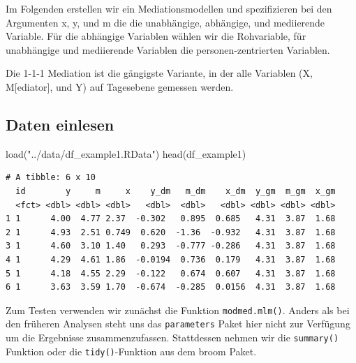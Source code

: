 \documentclass[
  letterpaper,
  DIV=11,
  numbers=noendperiod]{scrreprt}
\newenvironment{Shaded}{\begin{snugshade}}{\end{snugshade}}
\newcommand{\AttributeTok}[1]{\textcolor[rgb]{0.40,0.45,0.13}{#1}}
\newcommand{\CommentTok}[1]{\textcolor[rgb]{0.37,0.37,0.37}{#1}}
\newcommand{\ConstantTok}[1]{\textcolor[rgb]{0.56,0.35,0.01}{#1}}
\newcommand{\DecValTok}[1]{\textcolor[rgb]{0.68,0.00,0.00}{#1}}
\newcommand{\FunctionTok}[1]{\textcolor[rgb]{0.28,0.35,0.67}{#1}}
\newcommand{\NormalTok}[1]{\textcolor[rgb]{0.00,0.23,0.31}{#1}}
\newcommand{\OtherTok}[1]{\textcolor[rgb]{0.00,0.23,0.31}{#1}}
\newcommand{\SpecialCharTok}[1]{\textcolor[rgb]{0.37,0.37,0.37}{#1}}
\newcommand{\StringTok}[1]{\textcolor[rgb]{0.13,0.47,0.30}{#1}}
\begin{document}
Im Folgenden erstellen wir ein Mediationsmodellen und spezifizieren bei
den Argumenten x, y, und m die die unabhängige, abhängige, und
mediierende Variable. Für die abhängige Variablen wählen wir die
Rohvariable, für unabhängige und mediierende Variablen die
personen-zentrierten Variablen.

Die 1-1-1 Mediation ist die gängigste Variante, in der alle Variablen
(X, M{[}ediator{]}, und Y) auf Tagesebene gemessen werden.

\subsection{Daten einlesen}\label{daten-einlesen-2}

\begin{Shaded}
\begin{Highlighting}[]
\FunctionTok{load}\NormalTok{(}\StringTok{"../data/df\_example1.RData"}\NormalTok{)}
\FunctionTok{head}\NormalTok{(df\_example1)}
\end{Highlighting}
\end{Shaded}

\begin{verbatim}
# A tibble: 6 x 10
  id        y     m     x    y_dm   m_dm    x_dm  y_gm  m_gm  x_gm
  <fct> <dbl> <dbl> <dbl>   <dbl>  <dbl>   <dbl> <dbl> <dbl> <dbl>
1 1      4.00  4.77 2.37  -0.302   0.895  0.685   4.31  3.87  1.68
2 1      4.93  2.51 0.749  0.620  -1.36  -0.932   4.31  3.87  1.68
3 1      4.60  3.10 1.40   0.293  -0.777 -0.286   4.31  3.87  1.68
4 1      4.29  4.61 1.86  -0.0194  0.736  0.179   4.31  3.87  1.68
5 1      4.18  4.55 2.29  -0.122   0.674  0.607   4.31  3.87  1.68
6 1      3.63  3.59 1.70  -0.674  -0.285  0.0156  4.31  3.87  1.68
\end{verbatim}

Zum Testen verwenden wir zunächst die Funktion \texttt{modmed.mlm()}.
Anders als bei den früheren Analysen steht uns das \texttt{parameters}
Paket hier nicht zur Verfügung um die Ergebnisse zusammenzufassen.
Stattdessen nehmen wir die \texttt{summary()} Funktion oder die
\texttt{tidy()}-Funktion aus dem broom Paket.

\begin{Shaded}
\end{Shaded}
\end{document}
